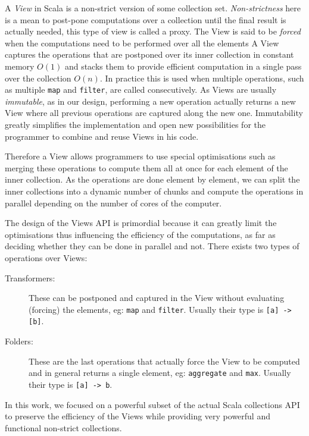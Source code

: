 \documentclass[a4paper,12pt,twocolumn]{article}
\begin{document}
A {\it View} in Scala is a non-strict version of some collection set.
{\it Non-strictness} here is a mean to post-pone computations over a collection until the final result is actually needed, this type of view is called a proxy.
The View is said to be {\it forced} when the %
computations need to be performed over all the elements%
A View captures the operations that are postponed over its inner collection in constant memory $O(1)$ and stacks them to provide efficient computation in a single pass over the collection $O(n)$. %
In practice this is used when multiple operations, such as multiple \verb|map| and \verb|filter|, are called consecutively.
As Views are usually {\it immutable}, as in our design, performing a new operation actually returns a new View where all previous operations are captured along the new one.%
Immutability greatly simplifies the implementation and open new possibilities for the programmer to combine and reuse Views in his code.

Therefore a View allows programmers to use special optimisations such as merging these operations to compute them all at once for each element of the inner collection.
As the operations are done element by element, we can split the inner collections into a dynamic number of chunks and compute the operations in parallel depending on the number of cores of the computer.

The design of the Views API is primordial because it can greatly limit the optimisations thus influencing the efficiency of the computations, as far as deciding whether they can be done in parallel and not.
There exists two types of operations over Views:
\begin{description}
    \item[Transformers:] These can be postponed and captured in the View without evaluating (forcing) the elements, eg: \verb|map| and \verb|filter|. Usually their type is \verb|[a] -> [b]|.
    \item[Folders:] These are the last operations that actually force the View to be computed and in general returns a single element, eg: \verb|aggregate| and \verb|max|. Usually their type is \verb|[a] -> b|.
\end{description}
In this work, we focused on a powerful subset of the actual Scala collections API to preserve the efficiency of the Views while providing very powerful and functional non-strict collections.
\end{document}
